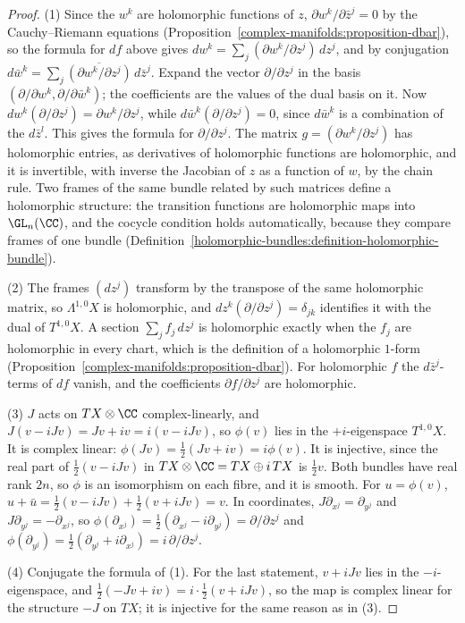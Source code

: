 \begin{proof}
(1) Since the $w^k$ are holomorphic functions of $z$, $\partial w^k/\partial\bar z^j = 0$ by the Cauchy--Riemann equations (Proposition~\ref{complex-manifolds:proposition-dbar}), so the formula for $df$ above gives
$dw^k = \sum_j(\partial w^k/\partial z^j)\,dz^j$, and by conjugation $d\bar w^k = \sum_j\overline{(\partial w^k/\partial z^j)}\,d\bar z^j$. Expand the vector $\partial/\partial z^j$ in the basis
$(\partial/\partial w^k, \partial/\partial\bar w^k)$; the coefficients are the values of the dual basis on it. Now $dw^k(\partial/\partial z^j) = \partial w^k/\partial z^j$, while $d\bar w^k(\partial/\partial z^j) = 0$, since
$d\bar w^k$ is a combination of the $d\bar z^l$. This gives the formula for $\partial/\partial z^j$. The matrix $g = (\partial w^k/\partial z^j)$ has holomorphic entries, as derivatives of holomorphic functions are
holomorphic, and it is invertible, with inverse the Jacobian of $z$ as a function of $w$, by the chain rule. Two frames of the same bundle related by such matrices define a holomorphic structure: the transition
functions are holomorphic maps into $\GL_n(\CC)$, and the cocycle condition holds automatically, because they compare frames of one bundle (Definition~\ref{holomorphic-bundles:definition-holomorphic-bundle}).

(2) The frames $(dz^j)$ transform by the transpose of the same holomorphic matrix, so $\Lambda^{1,0}X$ is holomorphic, and $dz^k(\partial/\partial z^j) = \delta_{jk}$ identifies it with the dual of $T^{1,0}X$. A
section $\sum_jf_j\,dz^j$ is holomorphic exactly when the $f_j$ are holomorphic in every chart, which is the definition of a holomorphic $1$-form (Proposition~\ref{complex-manifolds:proposition-dbar}). For holomorphic
$f$ the $d\bar z^j$-terms of $df$ vanish, and the coefficients $\partial f/\partial z^j$ are holomorphic.

(3) $J$ acts on $TX \otimes \CC$ complex-linearly, and $J(v - iJv) = Jv + iv = i(v - iJv)$, so $\phi(v)$ lies in the $+i$-eigenspace $T^{1,0}X$. It is complex linear: $\phi(Jv) = \frac12(Jv + iv) = i\phi(v)$.
It is injective, since the real part of $\frac12(v - iJv)$ in $TX \otimes \CC = TX \oplus i\,TX$ is $\frac12v$. Both bundles have real rank $2n$, so $\phi$ is an isomorphism on each fibre, and it is smooth. For
$u = \phi(v)$, $u + \bar u = \frac12(v - iJv) + \frac12(v + iJv) = v$. In coordinates, $J\partial_{x^j} = \partial_{y^j}$ and $J\partial_{y^j} = -\partial_{x^j}$, so
$\phi(\partial_{x^j}) = \frac12(\partial_{x^j} - i\partial_{y^j}) = \partial/\partial z^j$ and $\phi(\partial_{y^j}) = \frac12(\partial_{y^j} + i\partial_{x^j}) = i\,\partial/\partial z^j$.

(4) Conjugate the formula of (1). For the last statement, $v + iJv$ lies in the $-i$-eigenspace, and $\frac12(-Jv + iv) = i \cdot \frac12(v + iJv)$, so the map is complex linear for the structure $-J$ on $TX$; it is
injective for the same reason as in (3).
\end{proof}

